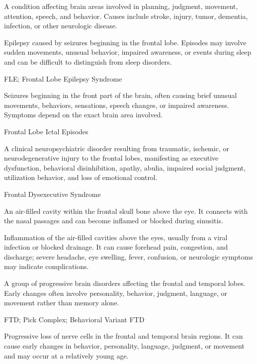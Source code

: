  A condition affecting brain areas involved in planning, judgment, movement, attention, speech, and behavior. Causes include stroke, injury, tumor, dementia, infection, or other neurologic disease.

 Epilepsy caused by seizures beginning in the frontal lobe. Episodes may involve sudden movements, unusual behavior, impaired awareness, or events during sleep and can be difficult to distinguish from sleep disorders.


\synonyms
FLE; Frontal Lobe Epilepsy Syndrome

 Seizures beginning in the front part of the brain, often causing brief unusual movements, behaviors, sensations, speech changes, or impaired awareness. Symptoms depend on the exact brain area involved.

\synonyms
Frontal Lobe Ictal Episodes

 A clinical neuropsychiatric disorder resulting from traumatic, ischemic, or neurodegenerative injury to the frontal lobes, manifesting as executive dysfunction, behavioral disinhibition, apathy, abulia, impaired social judgment, utilization behavior, and loss of emotional control.

\synonyms
Frontal Dysexecutive Syndrome

 An air-filled cavity within the frontal skull bone above the eye. It connects with the nasal passages and can become inflamed or blocked during sinusitis.

 Inflammation of the air-filled cavities above the eyes, usually from a viral infection or blocked drainage. It can cause forehead pain, congestion, and discharge; severe headache, eye swelling, fever, confusion, or neurologic symptoms may indicate complications.

 A group of progressive brain disorders affecting the frontal and temporal lobes. Early changes often involve personality, behavior, judgment, language, or movement rather than memory alone.

\synonyms
FTD; Pick Complex; Behavioral Variant FTD

 Progressive loss of nerve cells in the frontal and temporal brain regions. It can cause early changes in behavior, personality, language, judgment, or movement and may occur at a relatively young age.

